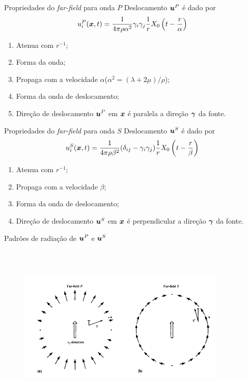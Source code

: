 \documentclass{beamer}
\begin{document}
\begin{frame}{Propriedades do \textit{far-field} para onda $P$}
	Deslocamento $\boldsymbol{u}^P$ é dado por
	$$u_i^P(\boldsymbol{x},t)= \frac{1}{4\pi \rho \alpha ^2}\gamma_i\gamma_j\frac{1}{r}X_0\left(t-\frac{r}{\alpha}\right)$$
\begin{enumerate}
	\justifying
\item Atenua com $r^{-1}$; 
\item Forma da onda;
\item Propaga com a velocidade $\alpha$($\alpha^2 = (\lambda +2\mu)/\rho$);
\item Forma da onda de deslocamento;
\item Direção de deslocamento $\boldsymbol{u}^P$ em $\boldsymbol{x}$ é paralela a direção $\boldsymbol{\gamma}$ da fonte.
\end{enumerate}
\end{frame}
\begin{frame}{Propriedades do \textit{far-field} para onda $S$}
	Deslocamento $\boldsymbol{u}^S$ é dado por
	$$u_i^S(\boldsymbol{x},t)= \frac{1}{4\pi \rho \beta ^2}(\delta_{ij}-\gamma_i\gamma_j)\frac{1}{r}X_0\left(t-\frac{r}{\beta}\right)$$
\begin{enumerate}
	\justifying
\item Atenua com $r^{-1}$; 
\item Propaga com a velocidade $\beta$;
\item Forma da onda de deslocamento;
\item Direção de deslocamento $\boldsymbol{u}^S$ em $\boldsymbol{x}$ é perpendicular a direção $\boldsymbol{\gamma}$ da fonte.	
\end{enumerate}
	
\end{frame}
\begin{frame}{Padrões de radiação de $\boldsymbol{u}^P$ e $\boldsymbol{u}^S$}
		\begin{figure}[htb]
		\centering
		\includegraphics[width= 10cm, height= 8cm]{radiacao}
	\end{figure}
\end{frame}
\end{document}
